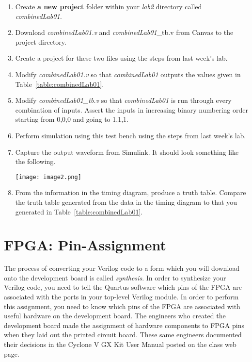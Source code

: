 \begin{enumerate}
\def\labelenumi{\arabic{enumi}.}
\item
  Create \textbf{a new project} folder within your \emph{lab2} directory
  called \emph{combinedLab01.}
\item
  Download \emph{combinedLab01.v} and \emph{combinedLab01}\_tb.v from
  Canvas to the project directory.
\item
  Create a project for these two files using the steps from last week's
  lab. 
\item
  Modify \emph{combinedLab01.v} so that \emph{combinedLab01} outputs the
  values given in Table~\ref{table:combinedLab01}.
\item
  Modify \emph{combinedLab01\_tb.v} so that \emph{combinedLab01} is run
  through every combination of inputs. Assert the inputs in increasing
  binary numbering order starting from 0,0,0 and going to 1,1,1.
\item
  Perform simulation using this test bench using the steps from last
  week's lab. 
  
\item
  \protect\hypertarget{CombinedLab01_Waveform}{}{}Capture the output
  waveform from Simulink. It should look something like the following.

\texttt{[image: image2.png]}

\item
  From the information in the timing diagram, produce a truth table.
  Compare the truth table generated from the data in the timing 
  diagram to that you generated in Table~\ref{table:combinedLab01}.
\end{enumerate}

\section{FPGA: Pin-Assignment}

The process of converting your Verilog code to a form which you will
download onto the development board is called \emph{synthesis}. In order
to synthesize your Verilog code, you need to tell the Quartus software
which pins of the FPGA are associated with the ports in your top-level
Verilog module. In order to perform this assignment, you need to know
which pins of the FPGA are associated with useful hardware on the
development board. The engineers who created the development board made
the assignment of hardware components to FPGA pins when they laid out
the printed circuit board. These same engineers documented their
decisions in the Cyclone V GX Kit User Manual posted on the class web
page.

